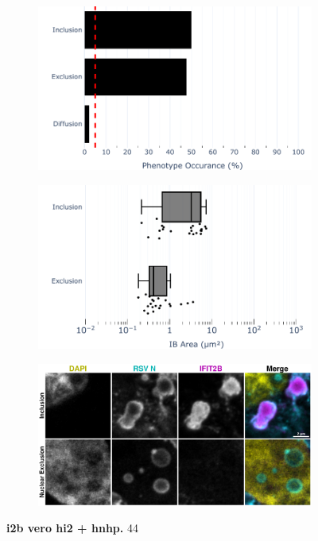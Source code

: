 \begin{figure}
    \begin{subfigure}{0.495\textwidth}
        \caption{}
        \includegraphics[width=1\linewidth]{10. Chapter 5/Figs/03. IFIT2-FLAG/02. IFIT2B/01. bar_i2b_hnhp.pdf} 
    \end{subfigure}
    \begin{subfigure}{0.495\textwidth}
        \caption{}
        \includegraphics[width=1\linewidth]{10. Chapter 5/Figs/03. IFIT2-FLAG/02. IFIT2B/02. box_i2a_hnhp.pdf}
    \end{subfigure}
    \begin{subfigure}{1\textwidth}
        \centering
        \caption{}
        \includegraphics[width=1\linewidth]{10. Chapter 5/Figs/03. IFIT2-FLAG/02. IFIT2B/03. i2b-hi2f-hnhp.pdf}
    \end{subfigure}
    \caption[i2b vero hi2 + hnhp]{\textbf{i2b vero hi2 + hnhp.} 44}
    \label{fig:i2b vero hi2 + hnhp}
\end{figure}

